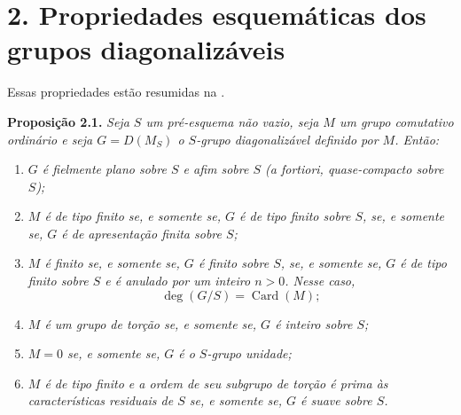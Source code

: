 
\section*{2. Propriedades esquemáticas dos grupos diagonalizáveis}

Essas propriedades estão resumidas na
.

\medskip
\noindent{}\textbf{Proposição 2.1.}
\textit{Seja \(S\) um pré-esquema não vazio, seja \(M\) um grupo comutativo
ordinário e seja \(G=D(M_S)\) o \(S\)-grupo diagonalizável definido por
\(M\). Então:}
\begin{enumerate}
  \item[(a)]
  \textit{\(G\) é fielmente plano sobre \(S\) e afim sobre \(S\) (a
  fortiori, quase-compacto sobre \(S\));}

  \item[(b)]
  \textit{\(M\) é de tipo finito se, e somente se, \(G\) é de tipo finito
  sobre \(S\), se, e somente se, \(G\) é de apresentação finita sobre \(S\);}

  \item[(c)]
  \textit{\(M\) é finito se, e somente se, \(G\) é finito sobre \(S\), se, e
  somente se, \(G\) é de tipo finito sobre \(S\) e é anulado por um inteiro
  \(n>0\). Nesse caso,}
  \[
    \deg(G/S)=\operatorname{Card}(M);
  \]

  \item[\((c')\)]
  \textit{\(M\) é um grupo de torção se, e somente se, \(G\) é inteiro
  sobre \(S\);}

  \item[(d)]
  \textit{\(M=0\) se, e somente se, \(G\) é o \(S\)-grupo unidade;}

  \item[(e)]
  \textit{\(M\) é de tipo finito e a ordem de seu subgrupo de torção é
  prima às características residuais de \(S\) se, e somente se, \(G\) é
  suave sobre \(S\).}
\end{enumerate}

